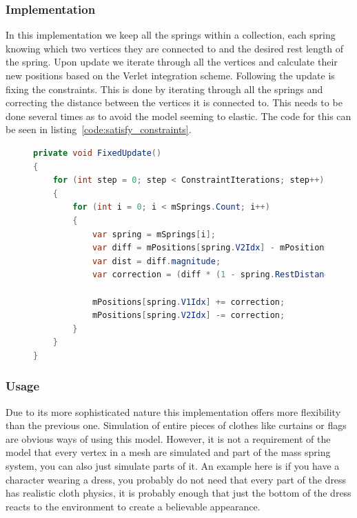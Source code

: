 %

\subsubsection{Implementation}
In this implementation we keep all the springs within a collection, each spring knowing which two vertices they are connected to and the desired rest length of the spring.
Upon update we iterate through all the vertices and calculate their new positions based on the Verlet integration scheme.
Following the update is fixing the constraints. This is done by iterating through all the springs and correcting the distance between the vertices it is connected to.
This needs to be done several times as to avoid the model seeming to elastic.
The code for this can be seen in listing~\ref{code:satisfy_constraints}.


\begin{figure}
\begin{lstlisting}[label={code:satisfy_constraints},language=csharp,caption={Semi-Implicit Euler Integration}]
private void FixedUpdate()
{
    for (int step = 0; step < ConstraintIterations; step++)
    {
        for (int i = 0; i < mSprings.Count; i++)
        {
            var spring = mSprings[i];
            var diff = mPositions[spring.V2Idx] - mPositions[spring.V1Idx];
            var dist = diff.magnitude;
            var correction = (diff * (1 - spring.RestDistance / dist)) * 0.5f;

            mPositions[spring.V1Idx] += correction;
            mPositions[spring.V2Idx] -= correction;
        }
    }
}
\end{lstlisting}
\end{figure}

\subsubsection{Usage}
Due to its more sophisticated nature this implementation offers more flexibility than the previous one.
Simulation of entire pieces of clothes like curtains or flags are obvious ways of using this model.
However, it is not a requirement of the model that every vertex in a mesh are simulated and part of the mass spring system, you can also just simulate parts of it.
An example here is if you have a character wearing a dress, you probably do not need that every part of the dress
has realistic cloth physics, it is probably enough that just the bottom of the dress reacts to the environment
to create a believable appearance.


